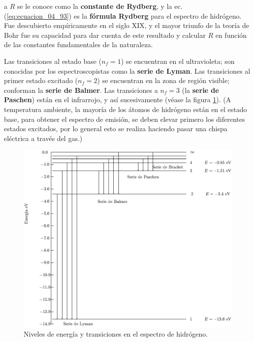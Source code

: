 a $R$ se le conoce como la \textbf{constante de Rydberg}, y la ec. (\ref{eq:ecuacion_04_93}) es la \textbf{fórmula Rydberg} para el espectro de hidrógeno. Fue descubierto empíricamente en el siglo XIX, y el mayor triunfo de la teoría de Bohr fue su capacidad para dar cuenta de este resultado y calcular $R$ en función de las constantes fundamentales de la naturaleza.
\par
Las transiciones al estado base ($n_{f}= 1$) se encuentran en el ultravioleta; son conocidas por los espectroscopistas como la \textbf{serie de Lyman}. Las transiciones al primer estado excitado ($n_{f}= 2$) se encuentran en la zona de región visible; conforman la \textbf{serie de Balmer}. Las transiciones a $n_{f} = 3$ (la \textbf{serie de Paschen}) están en el infrarrojo, y así sucesivamente (véase la figura \ref{fig:figura_espectro_H}). (A temperatura ambiente, la mayoría de los átomos de hidrógeno están en el estado base, para obtener el espectro de emisión, se deben elevar primero los diferentes estados excitados, por lo general esto se realiza haciendo pasar una chispa eléctrica a través del gas.)
\begin{figure}[H]
    \centering
    \includegraphics[scale=0.9]{Imagenes/espectrohidrogeno.eps}
    \caption{Niveles de energía y transiciones en el espectro de hidrógeno.}
    \label{fig:figura_espectro_H}
\end{figure}


